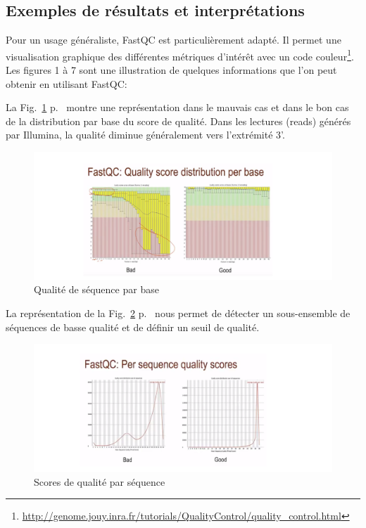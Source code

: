 \documentclass[a4paper,11pt]{article}
\begin{document}
\subsection{Exemples de résultats et interprétations}

Pour un usage généraliste, FastQC est particulièrement adapté. Il
permet une visualisation graphique des différentes métriques d'intérêt
avec un code
couleur\footnote{\url{http://genome.jouy.inra.fr/tutorials/QualityControl/quality_control.html}}. Les
figures 1 à 7 sont une illustration de quelques informations que l'on
peut obtenir en utilisant FastQC:

La Fig.~\ref{fig-Fastqc_Plots1} p.~\pageref{fig-Fastqc_Plots1} montre
une représentation dans le mauvais cas et dans le bon cas de la
distribution par base du score de qualité. Dans les lectures (reads)
générés par Illumina, la qualité diminue généralement vers l'extrémité
3'.

\begin{figure}
  \begin{center}
    \includegraphics[width=16cm]{Images/Fastqc_Plots1}
  \end{center}
  \caption{Qualité de séquence par base}
  \label{fig-Fastqc_Plots1}
\end{figure}

La représentation de la Fig.~\ref{fig-Fastqc_Plots2}
p.~\pageref{fig-Fastqc_Plots2} nous permet de détecter un
sous-ensemble de séquences de basse qualité et de définir un seuil de
qualité.

\begin{figure}
  \begin{center}
    \includegraphics[width=16cm]{Images/Fastqc_Plots2}
  \end{center}
  \caption{Scores de qualité par séquence}
  \label{fig-Fastqc_Plots2}
\end{figure}
\end{document}
